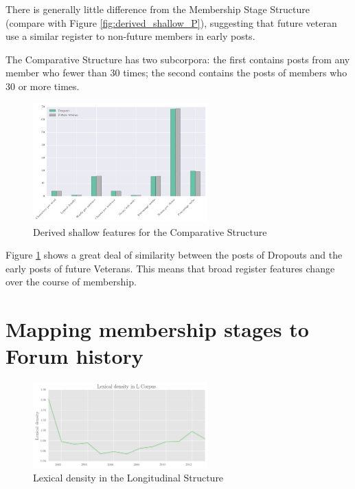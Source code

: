 There is generally little difference from the Membership Stage Structure (compare with Figure \ref{fig:derived_shallow_P}), suggesting that future veteran  use a similar register to non\hyp{}future \glspl{member} in early \glspl{post}.


The Comparative Structure has two subcorpora: the first contains \glspl{post} from any \gls{member} who  fewer than 30 times; the second contains the \glspl{post} of members who  30 or more times.

\begin{figure}[htb]
\centering
\includegraphics[width=0.6\textwidth]{../images/derived-shallow-features-in-C-corpus.png}
\caption{Derived shallow features for the Comparative Structure}
\label{fig:derived_shallow_C}
\end{figure}

Figure \ref{fig:derived_shallow_C} shows a great deal of similarity between the \glspl{post} of Dropouts and the early \glspl{post} of future Veterans. This means that broad register features change over the course of membership.

\section{Mapping membership stages to Forum history}

\begin{figure}[htb]
\centering
\includegraphics[width=0.6\textwidth]{../images/lexical-density-in-l-corpus.png}
\caption{Lexical density in the Longitudinal Structure}
\label{fig:lex_dens_L}
\end{figure}

